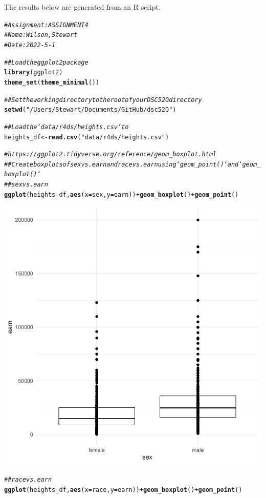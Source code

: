 \documentclass{article}\usepackage[]{graphicx}\usepackage[]{color}
\makeatletter
\newcommand{\hlstr}[1]{\textcolor[rgb]{0.192,0.494,0.8}{#1}}%
\newcommand{\hlcom}[1]{\textcolor[rgb]{0.678,0.584,0.686}{\textit{#1}}}%
\newcommand{\hlopt}[1]{\textcolor[rgb]{0,0,0}{#1}}%
\newcommand{\hlstd}[1]{\textcolor[rgb]{0.345,0.345,0.345}{#1}}%
\newcommand{\hlkwb}[1]{\textcolor[rgb]{0.69,0.353,0.396}{#1}}%
\newcommand{\hlkwc}[1]{\textcolor[rgb]{0.333,0.667,0.333}{#1}}%
\newcommand{\hlkwd}[1]{\textcolor[rgb]{0.737,0.353,0.396}{\textbf{#1}}}%
\newenvironment{kframe}{%
 \def\at@end@of@kframe{}%
 \ifinner\ifhmode%
  \def\at@end@of@kframe{\end{minipage}}%
  \begin{minipage}{\columnwidth}%
 \fi\fi%
 \def\FrameCommand##1{\hskip\@totalleftmargin \hskip-\fboxsep
 \colorbox{shadecolor}{##1}\hskip-\fboxsep
     \hskip-\linewidth \hskip-\@totalleftmargin \hskip\columnwidth}%
 \MakeFramed {\advance\hsize-\width
   \@totalleftmargin\z@ \linewidth\hsize
   \@setminipage}}%
 {\par\unskip\endMakeFramed%
 \at@end@of@kframe}
\newenvironment{knitrout}{}{} %
\makeatother
\begin{document}
The results below are generated from an R script.

\begin{knitrout}
\color{fgcolor}\begin{kframe}
\begin{alltt}
\hlcom{# Assignment: ASSIGNMENT 4}
\hlcom{# Name: Wilson, Stewart}
\hlcom{# Date: 2022-5-1}

\hlcom{## Load the ggplot2 package}
\hlkwd{library}\hlstd{(ggplot2)}
\hlkwd{theme_set}\hlstd{(}\hlkwd{theme_minimal}\hlstd{())}

\hlcom{## Set the working directory to the root of your DSC 520 directory}
\hlkwd{setwd}\hlstd{(}\hlstr{"/Users/Stewart/Documents/GitHub/dsc520"}\hlstd{)}

\hlcom{## Load the `data/r4ds/heights.csv` to}
\hlstd{heights_df} \hlkwb{<-} \hlkwd{read.csv}\hlstd{(}\hlstr{"data/r4ds/heights.csv"}\hlstd{)}

\hlcom{# https://ggplot2.tidyverse.org/reference/geom_boxplot.html}
\hlcom{## Create boxplots of sex vs. earn and race vs. earn using `geom_point()` and `geom_boxplot()`}
\hlcom{## sex vs. earn}
\hlkwd{ggplot}\hlstd{(heights_df,} \hlkwd{aes}\hlstd{(}\hlkwc{x}\hlstd{=sex,} \hlkwc{y}\hlstd{=earn))} \hlopt{+} \hlkwd{geom_boxplot}\hlstd{()}\hlopt{+} \hlkwd{geom_point}\hlstd{()}
\end{alltt}
\end{kframe}

{\centering \includegraphics[width=.6\linewidth]{figure/assignment-04-WilsonStewart-Rnwauto-report-1} 

}


\begin{kframe}\begin{alltt}
\hlcom{## race vs. earn}
\hlkwd{ggplot}\hlstd{(heights_df,} \hlkwd{aes}\hlstd{(}\hlkwc{x}\hlstd{=race,} \hlkwc{y}\hlstd{=earn))} \hlopt{+} \hlkwd{geom_boxplot}\hlstd{()}\hlopt{+} \hlkwd{geom_point}\hlstd{()}
\end{alltt}
\end{kframe}


\end{knitrout}
\end{document}
